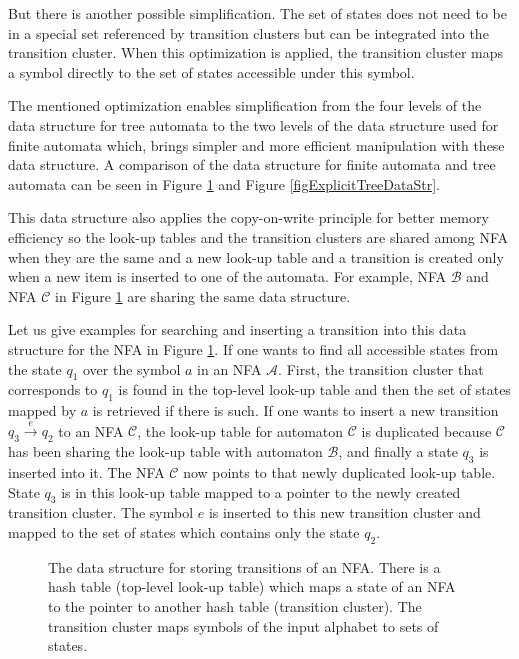 But there is another possible simplification. The set of states does not need to be in a special set referenced by transition clusters but can be integrated
into the transition cluster. When this optimization is applied, the transition cluster maps a symbol directly to the set of states accessible under this symbol.

The mentioned optimization enables simplification from the four levels of the data structure for tree automata to the two levels of the
data structure used for finite automata which, 
brings simpler and more efficient manipulation with these data structure. A comparison of the data structure for finite automata and 
tree automata can be seen in Figure \ref{figExplicitFADataStr} and Figure \ref{figExplicitTreeDataStr}.

This data structure also applies the copy-on-write principle for better memory efficiency so the look-up tables and 
the transition clusters are shared among NFA when they are the same and
a new look-up table and a transition is created only when a new item is inserted to one of the automata. For example, NFA $\mathcal{B}$ and NFA $\mathcal{C}$
in Figure \ref{figExplicitFADataStr} are sharing the same data structure.

Let us give examples for searching and inserting a transition into this data structure for the NFA in Figure \ref{figExplicitFADataStr}. 
If one wants to find all accessible states from the state $q_1$ over the symbol $a$ in an NFA $\mathcal{A}$.
First, the transition cluster that corresponds to $q_1$ is found in the top-level look-up table and then the set of states mapped by $a$ is retrieved if there
is such.
If one wants to insert a new transition $q_3 \xrightarrow{e} q_2$ to an NFA $\mathcal{C}$, the look-up table for automaton $\mathcal{C}$ is duplicated
because $\mathcal{C}$ has been sharing the look-up table with automaton $\mathcal{B}$,
and finally a state $q_3$ is inserted into it. The NFA $\mathcal{C}$ now points to that newly duplicated look-up table. State $q_3$ is in this look-up table 
mapped to a pointer to the newly created transition cluster. 
The symbol $e$ is inserted to this new transition cluster and mapped to the set of states which contains only the state $q_2$.

\begin{figure}[bt]
\begin{center}

    \caption{The data structure for storing transitions of an NFA. There is a hash table (top-level look-up table) 
      which maps a state of an NFA to the pointer to another hash table (transition cluster). The transition cluster maps symbols of the input alphabet
      to sets of states.}
		\label{figExplicitFADataStr}
\end{center}
\end{figure}

